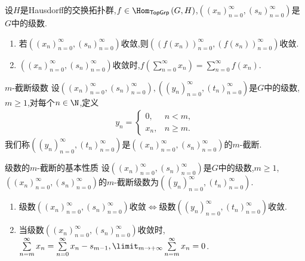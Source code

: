 \begin{proposition}{}{}
	设$H$是Hausdorff的交换拓扑群,$f\in\Hom_{\mathsf{TopGrp}}\left(G,H\right)$,$\left(\left(x_{n}\right)_{n=0}^{\infty},\left(s_{n}\right)_{n=0}^{\infty}\right)$是$G$中的级数.
	\begin{enumerate}
		\item 若$\left(\left(x_{n}\right)_{n=0}^{\infty},\left(s_{n}\right)_{n=0}^{\infty}\right)$收敛,则$\left(\left(f\left(x_{n}\right)\right)_{n=0}^{\infty},\left(f\left(s_{n}\right)\right)_{n=0}^{\infty}\right)$收敛.
		\item $\left(\left(x_{n}\right)_{n=0}^{\infty},\left(s_{n}\right)_{n=0}^{\infty}\right)$收敛时,$f\left(\sum\limits_{n=0}^{\infty}x_{n}\right)=\sum\limits_{n=0}^{\infty}f\left(x_{n}\right)$.
	\end{enumerate}
\end{proposition}






















\begin{definition}{$m$-截断级数}{}
	设$\left(\left(x_{n}\right)_{n=0}^{\infty},\left(s_{n}\right)_{n=0}^{\infty}\right),\left(\left(y_{n}\right)_{n=0}^{\infty},\left(t_{n}\right)_{n=0}^{\infty}\right)$是$G$中的级数,$m\geq 1$,对每个$n\in\N$,定义
	\begin{align*}
		y_{n}=
		\begin{cases}
			0,&n<m,\\
			x_{n},&n\geq m.
		\end{cases}
	\end{align*}
	我们称$\left(\left(y_{n}\right)_{n=0}^{\infty},\left(t_{n}\right)_{n=0}^{\infty}\right)$是$\left(\left(x_{n}\right)_{n=0}^{\infty},\left(s_{n}\right)_{n=0}^{\infty}\right)$的$m$-截断.
\end{definition}

\begin{proposition}{级数的$m$-截断的基本性质}{}
	设$\left(\left(x_{n}\right)_{n=0}^{\infty},\left(s_{n}\right)_{n=0}^{\infty}\right)$是$G$中的级数,$m\geq 1$,$\left(\left(x_{n}\right)_{n=0}^{\infty},\left(s_{n}\right)_{n=0}^{\infty}\right)$的$m$-截断级数为$\left(\left(y_{n}\right)_{n=0}^{\infty},\left(t_{n}\right)_{n=0}^{\infty}\right)$.
	\begin{enumerate}
		\item 级数$\left(\left(x_{n}\right)_{n=0}^{\infty},\left(s_{n}\right)_{n=0}^{\infty}\right)$收敛$\iff$级数$\left(\left(y_{n}\right)_{n=0}^{\infty},\left(t_{n}\right)_{n=0}^{\infty}\right)$收敛.
		\item 当级数$\left(\left(x_{n}\right)_{n=0}^{\infty},\left(s_{n}\right)_{n=0}^{\infty}\right)$收敛时,$\sum\limits_{n=m}^{\infty}x_{n}=\sum\limits_{n=0}^{\infty}x_{n}-s_{m-1},\limit_{m\to+\infty}\sum\limits_{n=m}^{\infty}x_{n}=0$.
	\end{enumerate}
\end{proposition}

